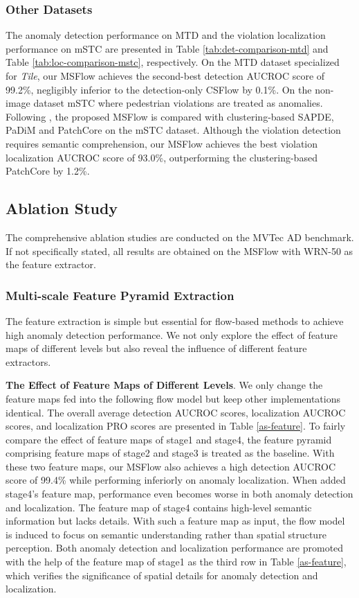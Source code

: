 \documentclass[lettersize,journal]{IEEEtran}
\begin{document}
\subsubsection{Other Datasets}
The anomaly detection performance on MTD and the violation localization performance on mSTC are presented in Table \ref{tab:det-comparison-mtd} and Table \ref{tab:loc-comparison-mstc}, respectively. On the MTD dataset specialized for \textit{Tile}, our MSFlow achieves the second-best detection AUCROC score of 99.2\%, negligibly inferior to the detection-only CSFlow by 0.1\%. On the non-image dataset mSTC where pedestrian violations are treated as anomalies.
Following \cite{roth2021patchcore}, the proposed MSFlow is compared with clustering-based SAPDE\cite{cohen2020spade}, PaDiM\cite{defard2021padim} and PatchCore\cite{roth2021patchcore} on the mSTC dataset. Although the violation detection requires semantic comprehension, our MSFlow achieves the best violation localization AUCROC score of 93.0\%, outperforming the clustering-based PatchCore \cite{roth2021patchcore} by 1.2\%.  
  



\subsection{Ablation Study}
The comprehensive ablation studies are conducted on the MVTec AD benchmark. If not specifically stated, all results are obtained on the MSFlow with WRN-50 as the feature extractor.

\subsubsection{Multi-scale Feature Pyramid Extraction}
The feature extraction is simple but essential for flow-based methods to achieve high anomaly detection performance. We not only explore the effect of feature maps of different levels but also reveal the influence of different feature extractors.

\vspace{3pt}\textbf{The Effect of Feature Maps of Different Levels}. We only change the feature maps fed into the following flow model but keep other implementations identical. The overall average detection AUCROC scores, localization AUCROC scores, and localization PRO scores are presented in Table \ref{as-feature}. To fairly compare the effect of feature maps of stage1 and stage4, the feature pyramid comprising feature maps of stage2 and stage3 is treated as the baseline. With these two feature maps, our MSFlow also achieves a high detection AUCROC score of 99.4\% while performing inferiorly on anomaly localization. When added stage4's feature map, performance even becomes worse in both anomaly detection and localization. The feature map of stage4 contains high-level semantic information but lacks details. With such a feature map as input, the flow model is induced to focus on semantic understanding rather than spatial structure perception. 
Both anomaly detection and localization performance are promoted with the help of the feature map of stage1 as the third row in Table \ref{as-feature}, which verifies the significance of spatial details for anomaly detection and localization. 
\end{document}
